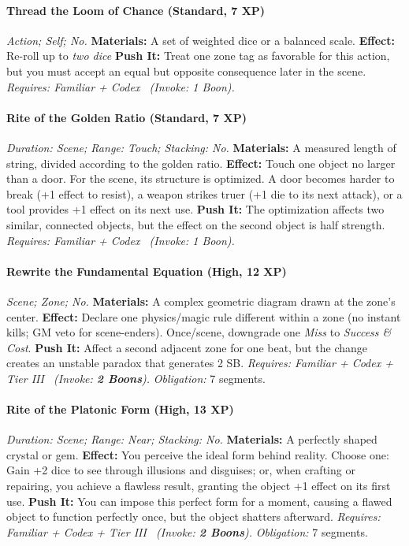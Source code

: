 \paragraph{Thread the Loom of Chance (Standard, 7 XP)} \emph{Action; Self; No.}
\textbf{Materials:} A set of weighted dice or a balanced scale.
\textbf{Effect:} Re-roll up to \emph{two dice}
\textbf{Push It:} Treat one zone tag as favorable for this action, but you must accept an equal but opposite consequence later in the scene.
\emph{Requires: Familiar + Codex \ (\textit{Invoke:} 1 Boon).}
\paragraph{Rite of the Golden Ratio (Standard, 7 XP)} \emph{Duration: Scene; Range: Touch; Stacking: No.}
\textbf{Materials:} A measured length of string, divided according to the golden ratio.
\textbf{Effect:} Touch one object no larger than a door. For the scene, its structure is optimized. A door becomes harder to break (+1 effect to resist), a weapon strikes truer (+1 die to its next attack), or a tool provides +1 effect on its next use.
\textbf{Push It:} The optimization affects two similar, connected objects, but the effect on the second object is half strength.
\emph{Requires: Familiar + Codex \ (\textit{Invoke:} 1 Boon).}
\paragraph{Rewrite the Fundamental Equation (High, 12 XP)} \emph{Scene; Zone; No.}
\textbf{Materials:} A complex geometric diagram drawn at the zone's center.
\textbf{Effect:} Declare one physics/magic rule different within a zone (no instant kills; GM veto for scene-enders). Once/scene, downgrade one \emph{Miss} to \emph{Success \& Cost}.
\textbf{Push It:} Affect a second adjacent zone for one beat, but the change creates an unstable paradox that generates 2 SB.
\emph{Requires: Familiar + Codex + Tier III \ (\textit{Invoke:} \textbf{2 Boons}).}
\emph{Obligation:} 7 segments.

\paragraph{Rite of the Platonic Form (High, 13 XP)} \emph{Duration: Scene; Range: Near; Stacking: No.}
\textbf{Materials:} A perfectly shaped crystal or gem.
\textbf{Effect:} You perceive the ideal form behind reality. Choose one: Gain +2 dice to see through illusions and disguises; or, when crafting or repairing, you achieve a flawless result, granting the object +1 effect on its first use.
\textbf{Push It:} You can impose this perfect form for a moment, causing a flawed object to function perfectly once, but the object shatters afterward.
\emph{Requires: Familiar + Codex + Tier III \ (\textit{Invoke:} \textbf{2 Boons}).}
\emph{Obligation:} 7 segments.

